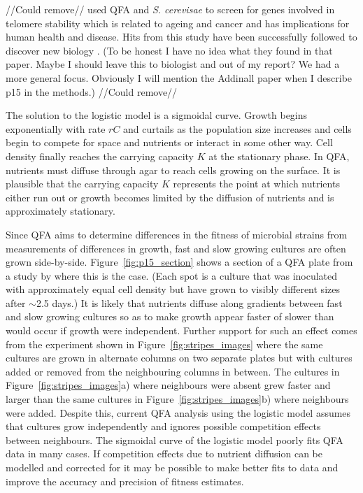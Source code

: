 //Could remove//
\citet{Addinall2011} used QFA and \textit{S. cerevisae} to screen for
genes involved in telomere stability which is related to ageing and
cancer and has implications for human health and disease. Hits from
this study have been successfully followed to discover new biology
\citep{Holstein20141259}. (To be honest I have no idea what they found
in that paper. Maybe I should leave this to biologist and out of my
report? We had a more general focus. Obviously I will mention the
Addinall paper when I describe p15 in the methods.)
//Could remove//




The solution to the logistic model is a sigmoidal curve. Growth begins
exponentially with rate \(rC\) and curtails as the population size
increases and cells begin to compete for space and nutrients or
interact in some other way. Cell density finally reaches the carrying
capacity \(K\) at the stationary phase. In QFA, nutrients must diffuse
through agar to reach cells growing on the surface. It is plausible
that the carrying capacity \(K\) represents the point at which
nutrients either run out or growth becomes limited by the diffusion of
nutrients and is approximately stationary.

Since QFA aims to determine differences in the fitness of microbial
strains from measurements of differences in growth, fast and slow
growing cultures are often grown
side-by-side. Figure~\ref{fig:p15_section} shows a section of a QFA
plate from a study by \citeauthor*{Addinall2011} where this is the
case. (Each spot is a culture that was inoculated with approximately
equal cell density but have grown to visibly different sizes after
\(\sim\)2.5 days.) It is likely that nutrients diffuse along gradients
between fast and slow growing cultures so as to make growth appear
faster of slower than would occur if growth were independent. Further
support for such an effect comes from the experiment shown in
Figure~\ref{fig:stripes_images} where the same cultures are grown in
alternate columns on two separate plates but with cultures added or
removed from the neighbouring columns in between. The cultures in
Figure~\ref{fig:stripes_images}a) where neighbours were absent grew
faster and larger than the same cultures in
Figure~\ref{fig:stripes_images}b) where neighbours were added. Despite
this, current QFA analysis using the logistic model assumes that
cultures grow independently and ignores possible competition effects
between neighbours. The sigmoidal curve of the logistic model poorly
fits QFA data in many cases. If competition effects due to nutrient
diffusion can be modelled and corrected for it may be possible to make
better fits to data and improve the accuracy and precision of fitness
estimates.



